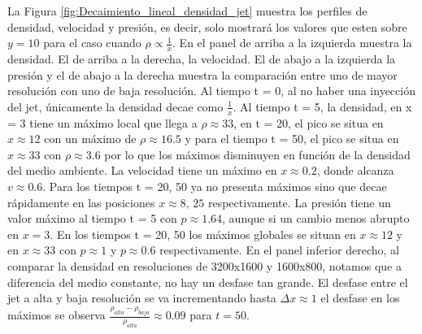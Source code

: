 \documentclass[12pt,a4paper]{book}
\begin{document}
La Figura \ref{fig:Decaimiento_lineal_densidad_jet} muestra los perfiles de densidad, velocidad y presión, es decir, 
solo mostrará los valores que esten sobre $y = 10$ {para el caso cuando $\rho \varpropto \frac{1}{x}$}. En el panel de arriba 
a la izquierda  muestra la densidad. El de arriba a la derecha, la velocidad. El de abajo a la izquierda la presión y 
el de abajo a la derecha muestra la comparación entre
uno de mayor resolución con uno de baja resolución. Al tiempo t = 0, al no haber una inyección del jet, únicamente la densidad 
decae como $\frac{1}{x}$. Al tiempo t = 5, la densidad, en x = 3 tiene un máximo local que llega a 
$\rho  \approx 33$, en t = 20, el pico se situa en $x \approx 12$ con un máximo de 
$\rho  \approx 16.5$ y para el 
tiempo t = 50, el pico se situa en $x \approx 33$ con $\rho  \approx 3.6$ por lo que los máximos disminuyen en función de la 
densidad del medio ambiente.
La velocidad tiene un máximo en $x \approx 0.2$, donde alcanza  $v \approx 0.6$. Para los tiempos t = 20, 50 ya no 
presenta máximos sino que decae rápidamente en las posiciones $x \approx 8, \, 25$ respectivamente.
La presión tiene un valor máximo al tiempo t = 5 con $p \approx 1.64$, aunque si un cambio menos abrupto en $x = 3$. 
En los tiempos t = 20, 50 los máximos globales se situan en $x \approx 12$ y en $x \approx 33$ 
con $p \approx  1$ y $p  \approx 0.6$ respectivamente.
En el panel inferior derecho, al comparar la densidad en resoluciones de 3200x1600 y 1600x800,
notamos que a diferencia del medio constante, no hay un desfase tan grande. El desfase entre el jet a alta y baja resolución 
se va incrementando hasta $\Delta x \approx 1$  {\color{red} el desfase en los 
máximos se observa  $\frac{\rho_{alta} - \rho_{baja}}{\rho_{alta}} \approx 0.09$} para $t = 50$. 
\end{document}
